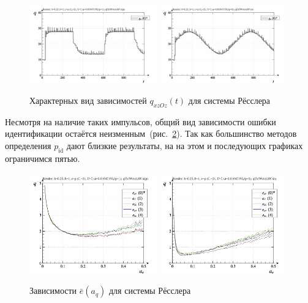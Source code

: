 \begin{figure}[ht!]
\begin{center}
  \includegraphics[width=0.49\textwidth]{p/cha/ross/ross_id-p_t_q_ql3rlWvnAAW_sign.png}
  \hfill
  \includegraphics[width=0.49\textwidth]{p/cha/ross/ross_id-p_t_q_ql3rlWvnAAW_sin.png}
\end{center}
  \caption{Характерных вид зависимостей $q_{xzOz}(t)$ для системы Рёсслера}
\label{atu:f:ross_q_t}
\end{figure}

Несмотря на наличие таких импульсов,
общий вид зависимости ошибки идентификации
остаётся неизменным~(рис.~\ref{atu:f:ross_e_a_q}).
Так как большинство методов определения $p_\mathrm{id}$
дают близкие результаты, на на этом и последующих графиках
ограничимся пятью.

\begin{figure}[ht!]
\begin{center}
  \includegraphics[width=0.49\textwidth]{p/cha/ross/ross_id-p_a_q_ql3rlWvnAAW_sign.png}
  \hfill
  \includegraphics[width=0.49\textwidth]{p/cha/ross/ross_id-p_a_q_ql3rlWvnAAW_sin.png}
\end{center}
  \caption{Зависимости $\bar{e}(a_q)$ для системы Рёсслера}
\label{atu:f:ross_e_a_q}
\end{figure}

